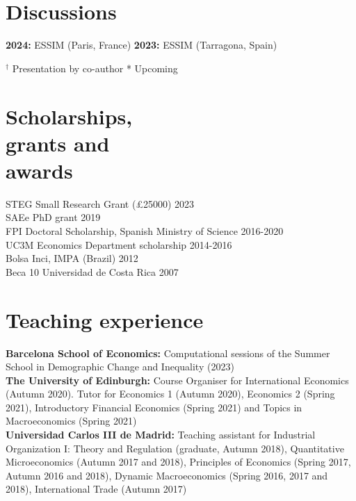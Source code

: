 \documentclass[margin]{res} %
\begin{document}
\begin{resume}
\section{Discussions}
{\bf 2024:} ESSIM (Paris, France) {\bf 2023:} ESSIM (Tarragona, Spain)

$^\dagger$ Presentation by co-author * Upcoming


\section{Scholarships, \\ grants and \\ awards} 

STEG Small Research Grant (£25000) \hfill 2023 \\
SAEe PhD grant \hfill 2019\\
FPI Doctoral Scholarship, Spanish Ministry of Science \hfill 2016-2020 \\
UC3M Economics Department scholarship \hfill 2014-2016 \\
Bolsa Inci, IMPA (Brazil) \hfill 2012 \\
Beca 10 Universidad de Costa Rica \hfill 2007


\section{Teaching experience}

{\bf Barcelona School of Economics:} Computational sessions of the Summer School in Demographic Change and Inequality (2023) \\
{\bf The University of Edinburgh:} Course Organiser for International Economics (Autumn 2020). Tutor for Economics 1 (Autumn 2020), Economics 2 (Spring 2021), Introductory Financial Economics (Spring 2021) and Topics in Macroeconomics (Spring 2021) \\
{\bf Universidad Carlos III de Madrid:} Teaching assistant for Industrial Organization I: Theory and Regulation (graduate, Autumn 2018), Quantitative Microeconomics (Autumn 2017 and 2018), Principles of Economics (Spring 2017, Autumn 2016 and 2018), Dynamic Macroeconomics (Spring 2016, 2017 and 2018), International Trade (Autumn 2017)


\end{resume}
\end{document}
